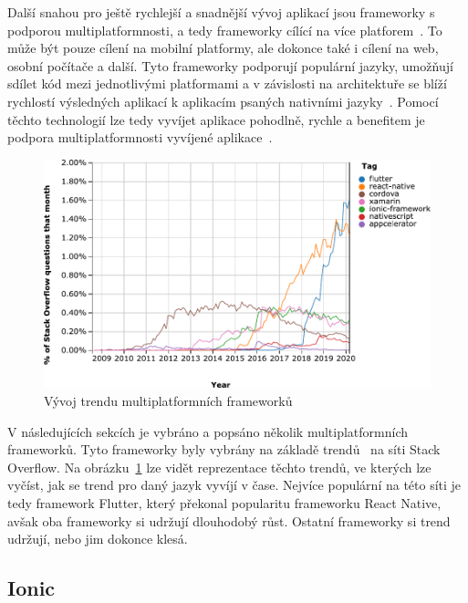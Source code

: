 Další snahou pro ještě rychlejší a snadnější vývoj aplikací jsou frameworky
s podporou multiplatformnosti,
a tedy frameworky cílící na více platforem~\cite{hackernoon_flutter}.
To může být pouze cílení na mobilní platformy,
ale dokonce také i cílení na web, osobní počítače a další.
Tyto frameworky podporují populární jazyky,
umožňují sdílet kód mezi jednotlivými platformami
a v závislosti na architektuře se blíží rychlostí výsledných aplikací
k aplikacím psaných nativními jazyky~\cite{hackernoon_flutter}.
Pomocí těchto technologií lze tedy vyvíjet aplikace pohodlně, rychle
a benefitem  je podpora multiplatformnosti vyvíjené
aplikace~\cite{dashmagazine_mobile_frameworks}.

\begin{figure}[ht!]
    \centering
    \includegraphics[width=\linewidth]{assets/technology-research/framework/popularity.pdf}
    \caption{Vývoj trendu multiplatformních
    frameworků~\cite{framework_popularity}}
    \label{fig:framework_popularity}
\end{figure}

V následujících sekcích je vybráno a popsáno několik multiplatformních
frameworků.
Tyto frameworky byly vybrány na základě trendů~\cite{framework_popularity}
na síti Stack Overflow.
Na obrázku~\ref{fig:framework_popularity} lze vidět reprezentace těchto trendů,
ve kterých lze vyčíst,
jak se trend pro daný jazyk vyvíjí v čase.
Nejvíce populární na této síti je tedy framework Flutter,
který překonal popularitu frameworku React Native,
avšak oba frameworky si udržují dlouhodobý růst.
Ostatní frameworky si trend udržují,
nebo jim dokonce klesá.

\subsection{Ionic}

